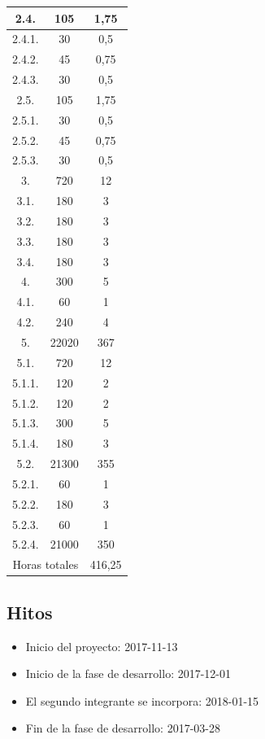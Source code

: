 \begin{longtable}{c|c|c}
\rowcolor{black!40}
2.4. & 105 & 1,75 \\ \hline
2.4.1. & 30 & 0,5 \\ \hline
2.4.2. & 45 & 0,75 \\ \hline
2.4.3. & 30 & 0,5 \\ \hline

\rowcolor{black!40}
2.5. & 105 & 1,75 \\ \hline
2.5.1. & 30 & 0,5 \\ \hline
2.5.2. & 45 & 0,75 \\ \hline
2.5.3. & 30 & 0,5 \\ \hline

\rowcolor{black!80}
\color{white}3. & \color{white}720 & \color{white}12 \\ \hline
3.1. & 180 & 3 \\ \hline
3.2. & 180 & 3 \\ \hline
3.3. & 180 & 3 \\ \hline
3.4. & 180 & 3 \\ \hline

\rowcolor{black!80}
\color{white}4. & \color{white}300 & \color{white}5 \\ \hline
4.1. & 60 & 1 \\ \hline
4.2. & 240 & 4 \\ \hline

\rowcolor{black!80}
\color{white}5. & \color{white}22020 & \color{white}367 \\ \hline
\rowcolor{black!40}
5.1. & 720 & 12 \\ \hline
5.1.1. & 120 & 2 \\ \hline
5.1.2. & 120 & 2 \\ \hline
5.1.3. & 300 & 5 \\ \hline
5.1.4. & 180 & 3 \\ \hline

\rowcolor{black!40}
5.2. & 21300 & 355 \\ \hline
5.2.1. & 60 & 1 \\ \hline
5.2.2. & 180 & 3 \\ \hline
5.2.3. & 60 & 1 \\ \hline
5.2.4. & 21000 & 350 \\ \hline
\multicolumn{2}{c|}{Horas totales} & 416,25 \\
\end{longtable}

\subsection{Hitos}
\begin{itemize}
  \item Inicio del proyecto: 2017-11-13
  \item Inicio de la fase de desarrollo: 2017-12-01
  \item El segundo integrante se incorpora: 2018-01-15
  \item Fin de la fase de desarrollo: 2017-03-28
\end{itemize}

